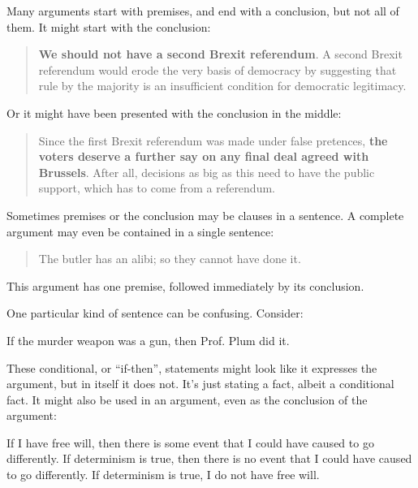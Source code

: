 
Many arguments start with premises, and end with a conclusion, but not all of them. It might start with the conclusion:
	\begin{quote}\textbf{We should not have a second Brexit referendum}.
		A second Brexit referendum would erode the very basis of
		democracy by suggesting that rule by the majority is an insufficient
		condition for democratic legitimacy.
	\end{quote}
Or it might have been presented with the conclusion in the middle:
	\begin{quote}
		Since the first Brexit referendum was made under false pretences,
		\textbf{the voters deserve a further say on any final deal agreed with
		Brussels}. After all, decisions as big as this need to have the public
		support, which has to come from a referendum.
	\end{quote}


Sometimes premises or the conclusion may be clauses in a sentence.
A complete argument may even be contained in a single sentence:
\begin{quote}
The butler has an alibi; so they cannot have done it.
\end{quote}
This argument has one premise, followed immediately by its conclusion.

One particular kind of sentence can be confusing. Consider:
\begin{ebullet}
\item  If the murder weapon was a gun, then Prof. Plum did it.
\end{ebullet}
These conditional, or ``if-then'', statements might look like it expresses the argument, but in itself it does not. It's just stating a fact, albeit a conditional fact. It might also be used in an argument, even as the conclusion of the argument:
	\begin{earg}
	\prem  If I have free will, then there is some event that I could have caused to go differently.
	\prem  If determinism is true, then there is no event that I could have caused to go differently.
	\conc If determinism is true, I do not have free will.
	\end{earg}

